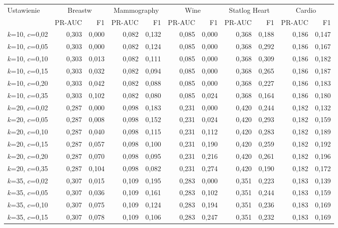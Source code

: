 \begin{longtable}{lrrrrrrrrrr}
\toprule
Ustawienie & \multicolumn{2}{c}{Breastw} & \multicolumn{2}{c}{Mammography} & \multicolumn{2}{c}{Wine} & \multicolumn{2}{c}{Statlog Heart} & \multicolumn{2}{c}{Cardio} \\
 & PR-AUC & F1 & PR-AUC & F1 & PR-AUC & F1 & PR-AUC & F1 & PR-AUC & F1 \\
\midrule
\endhead
$k$=10, $c$=0,02 & 0,303 & 0,000 & 0,082 & 0,132 & 0,085 & 0,000 & 0,368 & 0,188 & 0,186 & 0,147 \\
$k$=10, $c$=0,05 & 0,303 & 0,000 & 0,082 & 0,124 & 0,085 & 0,000 & 0,368 & 0,292 & 0,186 & 0,167 \\
$k$=10, $c$=0,10 & 0,303 & 0,013 & 0,082 & 0,111 & 0,085 & 0,000 & 0,368 & 0,309 & 0,186 & 0,182 \\
$k$=10, $c$=0,15 & 0,303 & 0,032 & 0,082 & 0,094 & 0,085 & 0,000 & 0,368 & 0,265 & 0,186 & 0,187 \\
$k$=10, $c$=0,20 & 0,303 & 0,042 & 0,082 & 0,088 & 0,085 & 0,000 & 0,368 & 0,227 & 0,186 & 0,183 \\
$k$=10, $c$=0,35 & 0,303 & 0,102 & 0,082 & 0,080 & 0,085 & 0,024 & 0,368 & 0,164 & 0,186 & 0,180 \\
$k$=20, $c$=0,02 & 0,287 & 0,000 & 0,098 & 0,183 & 0,231 & 0,000 & 0,420 & 0,244 & 0,182 & 0,132 \\
$k$=20, $c$=0,05 & 0,287 & 0,008 & 0,098 & 0,152 & 0,231 & 0,024 & 0,420 & 0,293 & 0,182 & 0,159 \\
$k$=20, $c$=0,10 & 0,287 & 0,040 & 0,098 & 0,115 & 0,231 & 0,112 & 0,420 & 0,283 & 0,182 & 0,189 \\
$k$=20, $c$=0,15 & 0,287 & 0,057 & 0,098 & 0,100 & 0,231 & 0,190 & 0,420 & 0,259 & 0,182 & 0,192 \\
$k$=20, $c$=0,20 & 0,287 & 0,070 & 0,098 & 0,095 & 0,231 & 0,216 & 0,420 & 0,261 & 0,182 & 0,196 \\
$k$=20, $c$=0,35 & 0,287 & 0,104 & 0,098 & 0,082 & 0,231 & 0,274 & 0,420 & 0,190 & 0,182 & 0,172 \\
$k$=35, $c$=0,02 & 0,307 & 0,015 & 0,109 & 0,195 & 0,283 & 0,000 & 0,351 & 0,223 & 0,183 & 0,139 \\
$k$=35, $c$=0,05 & 0,307 & 0,036 & 0,109 & 0,161 & 0,283 & 0,102 & 0,351 & 0,244 & 0,183 & 0,159 \\
$k$=35, $c$=0,10 & 0,307 & 0,075 & 0,109 & 0,124 & 0,283 & 0,194 & 0,351 & 0,236 & 0,183 & 0,169 \\
$k$=35, $c$=0,15 & 0,307 & 0,078 & 0,109 & 0,106 & 0,283 & 0,247 & 0,351 & 0,232 & 0,183 & 0,169 \\

\end{longtable}
